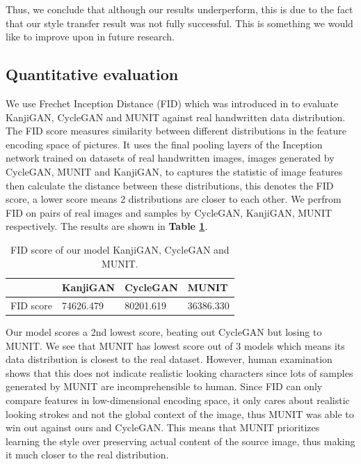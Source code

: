 \documentclass[12pt]{report}
\begin{document}
Thus, we conclude that although our results underperform, this is due to the fact that our style transfer result was not fully successful. This is something we would like to improve upon in future research.

\subsection{Quantitative evaluation}

We use Frechet Inception Distance (FID) which was introduced in \cite{fid} to evaluate KanjiGAN, CycleGAN and MUNIT against real handwritten data distribution. The FID score measures similarity between different distributions in the feature encoding space of pictures. It uses the final pooling layers of the Inception network trained on datasets of real handwritten images, images generated by CycleGAN, MUNIT and KanjiGAN, to captures the statistic of image features then calculate the distance between these distributions, this denotes the FID score, a lower score means 2 distributions are closer to each other. We perfrom FID on pairs of real images and samples by CycleGAN, KanjiGAN, MUNIT respectively. The results are shown in \textbf{Table \ref{tbl:fid}}.

\begin{table}[h]
	\centering
	\caption{FID score of our model KanjiGAN, CycleGAN and MUNIT.}
	\label{tbl:fid}
	\begin{tabular}{|l|l|l|l|}
		\hline
		\textbf{} & \textbf{KanjiGAN} & \textbf{CycleGAN} & \textbf{MUNIT}       \\ \hline
		FID score	&74626.479               & 80201.619        & 36386.330              \\ \hline
	\end{tabular}
\end{table}

Our model scores a 2nd lowest score, beating out CycleGAN but losing to MUNIT. We see that MUNIT has lowest score out of 3 models which means its data distribution is closest to the real dataset. However, human examination shows that this does not indicate realistic looking characters since lots of samples generated by MUNIT are incomprehensible to human. Since FID can only compare features in low-dimensional encoding space, it only cares about realistic looking strokes and not the global context of the image, thus MUNIT was able to win out against ours and CycleGAN. This means that MUNIT prioritizes learning the style over preserving actual content of the source image, thus making it much closer to the real distribution.
\end{document}
